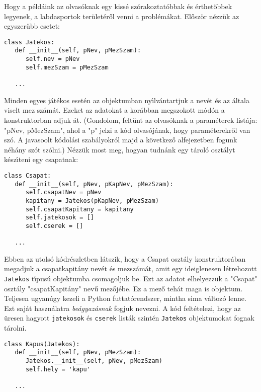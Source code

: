 Hogy a p\'eld\'aink az olvas\'oknak egy kiss\'e sz\'orakoztat\'obbak \'es \'erthet\H{o}bbek legyenek, a labdasportok 
ter\"ulet\'er\H{o}l venni a probl\'em\'akat. El\H{o}sz\"or n\'ezz\"uk az egyszer\H{u}bb esetet:

\begin{Verbatim}[fontsize=\small]
class Jatekos:
   def __init__(self, pNev, pMezSzam):
      self.nev = pNev
      self.mezSzam = pMezSzam

   ...
\end{Verbatim}

Minden egyes j\'at\'ekos eset\'en az objektumban ny\'{\i}lv\'antartjuk a nev\'et \'es az \'altala viselt mez sz\'am\'at. 
Ezeket az adatokat a kor\'abban megszokott m\'od\'on a konstruktorban adjuk \'at. (Gondolom, felt\"unt az olvas\'oknak 
a param\'eterek list\'aja: "pNev, pMezSzam", ahol a "p" jelzi a k\'od olvas\'oj\'anak, hogy param\'eterekr\H{o}l van sz\'o. 
A javasoolt k\'odol\'asi szab\'alyokr\'ol majd a k\"ovetkez\H{o} alfejezetben fogunk n\'eh\'any sz\'ot sz\'olni.) N\'ezz\"uk 
most meg, hogyan tudn\'ank egy t\'arol\'o oszt\'alyt k\'esz\'{\i}teni egy csapatnak:

\begin{Verbatim}[fontsize=\small]
class Csapat:
   def __init__(self, pNev, pKapNev, pMezSzam):
      self.csapatNev = pNev
      kapitany = Jatekos(pKapNev, pMezSzam)
      self.csapatKapitany = kapitany
      self.jatekosok = []
      self.cserek = []

   ...
\end{Verbatim}

Ebben az utols\'o k\'odr\'eszletben l\'atszik, hogy a Csapat oszt\'aly konstruktor\'aban megadjuk a csapatkapit\'any 
nev\'et \'es mezsz\'am\'at, amit egy ideiglenesen l\'etrehozott {\tt Jatekos} t\'{\i}pus\'u objektumba csomagoljuk be. 
Ezt az adatot elhelyezz\"uk a "Csapat" oszt\'aly "csapatKapit\'any" nev\H{u} mez\H{o}j\'ebe. Ez a mez\H{o} teh\'at 
maga is objektum. Teljesen ugyan\'ugy kezeli a Python futtat\'orendszer, mintha sima v\'altoz\'o lenne. Ezt saj\'at 
haszn\'alatra {\sl be\'agyaz\'asnak}  fogjuk nevezni. A k\'od felt\'etelezi, hogy az \"uresen 
hagyott {\tt jatekosok} \'es {\tt cserek} list\'ak szint\'en {\tt Jatekos} objektumokat fognak t\'arolni.

\begin{Verbatim}[fontsize=\small]
class Kapus(Jatekos):
   def __init__(self, pNev, pMezSzam):
      Jatekos.__init__(self, pNev, pMezSzam)
      self.hely = 'kapu' 

   ...
\end{Verbatim}

